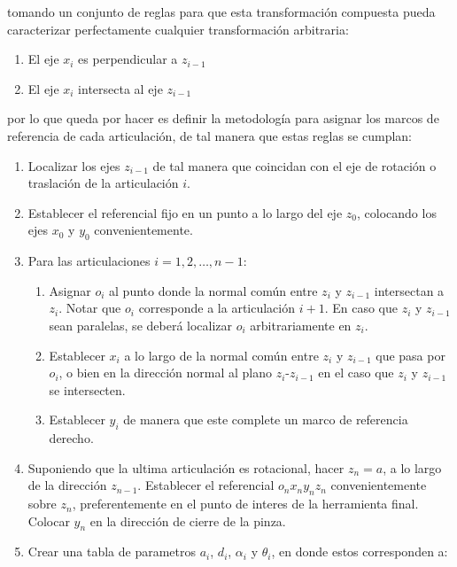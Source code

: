 \begin{multicols*}{2}
            tomando un conjunto de reglas para que esta transformación compuesta pueda caracterizar perfectamente cualquier transformación arbitraria:

            \begin{enumerate}
                \item El eje $x_i$ es perpendicular a $z_{i-1}$
                \item El eje $x_i$ intersecta al eje $z_{i-1}$
            \end{enumerate}

            por lo que queda por hacer es definir la metodología para asignar los marcos de referencia de cada articulación, de tal manera que estas reglas se cumplan:

            \begin{enumerate}
                \item Localizar los ejes $z_{i-1}$ de tal manera que coincidan con el eje de rotación o traslación de la articulación $i$.
                \item Establecer el referencial fijo en un punto a lo largo del eje $z_0$, colocando los ejes $x_0$ y $y_0$ convenientemente.
                \item Para las articulaciones $i = 1, 2, \dots, n-1$:
                \begin{enumerate}
                    \item Asignar $o_i$ al punto donde la normal común entre $z_i$ y $z_{i-1}$ intersectan a $z_i$. Notar que $o_i$ corresponde a la articulación $i+1$. En caso que $z_i$ y $z_{i-1}$ sean paralelas, se deberá localizar $o_i$ arbitrariamente en $z_i$.
                    \item Establecer $x_i$ a lo largo de la normal común entre $z_i$ y $z_{i-1}$ que pasa por $o_i$, o bien en la dirección normal al plano $z_i$-$z_{i-1}$ en el caso que $z_i$ y $z_{i-1}$ se intersecten.
                    \item Establecer $y_i$ de manera que este complete un marco de referencia derecho.
                \end{enumerate}
                \item Suponiendo que la ultima articulación es rotacional, hacer $z_n = a$, a lo largo de la dirección $z_{n-1}$. Establecer el referencial $o_n x_n y_n z_n$ convenientemente sobre $z_n$, preferentemente en el punto de interes de la herramienta final. Colocar $y_n$ en la dirección de cierre de la pinza.
                \item Crear una tabla de parametros $a_i$, $d_i$, $\alpha_i$ y $\theta_i$, en donde estos corresponden a:

\end{enumerate}
\end{multicols*}

